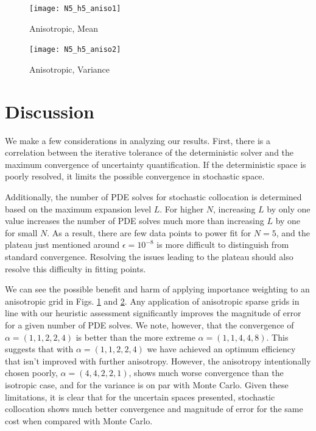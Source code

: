 \documentclass{anstrans}
\begin{document}
  \begin{figure}[htb]
   \texttt{[image: N5\_h5\_aniso1]}
   \caption{Anisotropic, Mean}
   \label{aniso1}
  \end{figure}
  \begin{figure}[htb]
   \texttt{[image: N5\_h5\_aniso2]}
   \caption{Anisotropic, Variance}
   \label{aniso2}
  \end{figure}



\section{Discussion}
We make a few considerations in analyzing our results.
First, there is a correlation between the iterative tolerance of the deterministic solver and the maximum convergence of uncertainty quantification.  If the deterministic space is poorly resolved, it limits the possible convergence in stochastic space.

Additionally, the number of PDE solves for stochastic collocation is determined based on the maximum expansion level $L$.  For higher $N$, increasing $L$ by only one value increases the number of PDE solves much more than increasing $L$ by one for small $N$.  As a result, there are few data points to power fit for $N=5$, and the plateau just mentioned around $\epsilon=10^{-8}$ is more difficult to distinguish from standard convergence.  Resolving the issues leading to the plateau should also resolve this difficulty in fitting points.

We can see the possible benefit and harm of applying importance weighting to an anisotropic grid in Figs. \ref{aniso1} and \ref{aniso2}.  Any application of anisotropic sparse grids in line with our heuristic assessment significantly improves the magnitude of error for a given number of PDE solves.  We note, however, that the convergence of $\alpha=(1,1,2,2,4)$ is better than the more extreme $\alpha=(1,1,4,4,8)$.  This suggests that with $\alpha=(1,1,2,2,4)$ we have achieved an optimum efficiency that isn't improved with further anisotropy.  However, the anisotropy intentionally chosen poorly, $\alpha=(4,4,2,2,1)$, shows much worse convergence than the isotropic case, and for the variance is on par with Monte Carlo.
Given these limitations, it is clear that for the uncertain spaces presented, stochastic collocation shows much better convergence and magnitude of error for the same cost when compared with Monte Carlo. 
\end{document}
